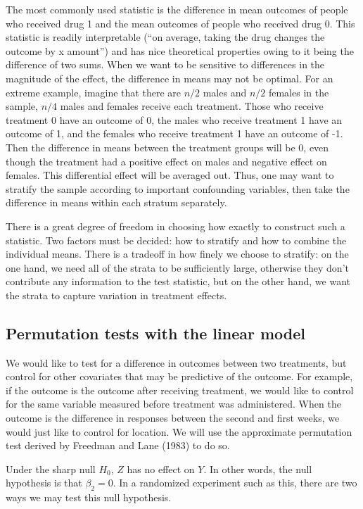 \documentclass[11pt]{article}
\newcommand{\todo}[1]{{\color{red}{TO DO: \sc #1}}}
\begin{document}
The most commonly used statistic is the difference in mean outcomes of people who received drug 1 and the mean outcomes of people who received drug 0.  This statistic is readily interpretable (``on average, taking the drug changes the outcome by x amount'') and has nice theoretical properties owing to it being the difference of two sums.
When we want to be sensitive to differences in the magnitude of the effect, the difference in means may not be optimal.  For an extreme example, imagine that there are $n/2$ males and $n/2$ females in the sample, $n/4$ males and females receive each treatment.  Those who receive treatment 0 have an outcome of 0, the males who receive treatment 1 have an outcome of 1, and the females who receive treatment 1 have an outcome of -1.  Then the difference in means between the treatment groups will be $0$, even though the treatment had a positive effect on males and negative effect on females.  This differential effect will be averaged out.
Thus, one may want to stratify the sample according to important confounding variables, then take the difference in means within each stratum separately. 

There is a great degree of freedom in choosing how exactly to construct such a statistic.
Two factors must be decided: how to stratify and how to combine the individual means.
There is a tradeoff in how finely we choose to stratify:
on the one hand, we need all of the strata to be sufficiently large, otherwise they don't contribute any information to the test statistic,
 but on the other hand, we want the strata to capture variation in treatment effects.
\todo{discussion of NPC and cite papers}


\subsection{Permutation tests with the linear model}
We would like to test for a difference in outcomes between two treatments, but control for other covariates that may be predictive of the outcome.
For example, if the outcome is the outcome after receiving treatment, we would like to control for the same variable measured before treatment was administered.
When the outcome is the difference in responses between the second and first weeks, we would just like to control for location.
We will use the approximate permutation test derived by Freedman and Lane (1983) to do so.

Under the sharp null $H_0$, $Z$ has no effect on $Y$.
In other words, the null hypothesis is that $\beta_2 = 0$.
In a randomized experiment such as this, there are two ways we may test this null hypothesis.
\end{document}
